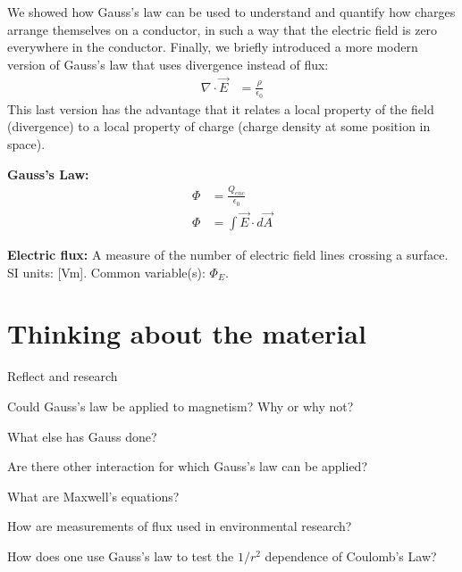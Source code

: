 \begin{chapterSummary}
\begin{enumerate}
\end{enumerate}
We showed how Gauss's law can be used to understand and quantify how charges arrange themselves on a conductor, in such a way that the electric field is zero everywhere in the conductor. Finally, we briefly introduced a more modern version of Gauss's law that uses divergence instead of flux:
\begin{align*}
\nabla \cdot \vec E &= \frac{\rho}{\epsilon_0}
\end{align*}
This last version has the advantage that it relates a local property of the field (divergence) to a local property of charge (charge density at some position in space). 




\end{chapterSummary}

\newpage
\begin{importantEquations}
\medskip
\begin{multicols}{2}
\textbf{Gauss's Law:}
\begin{align*}
\Phi & = \frac{Q_{enc}}{\epsilon_0}\\
\Phi &= \int \vec E \cdot d \vec A
\end{align*}
\columnbreak

\end{multicols}
\end{importantEquations}


\begin{definitions}
\item	\textbf{Electric flux:} A measure of the number of electric field lines crossing a surface. SI units: [\si{Vm}]. Common variable(s): $\Phi_E$.
\end{definitions}


\newpage
\section{Thinking about the material}

\begin{chapteractivity}{Reflect and research}
{
\item Could Gauss's law be applied to magnetism? Why or why not?
\item What else has Gauss done?
\item Are there other interaction for which Gauss's law can be applied?
\item What are Maxwell's equations? 
\item How are measurements of flux used in environmental research?
\item How does one use Gauss's law to test the $1/r^2$ dependence of Coulomb's Law?
}
\end{chapteractivity}


